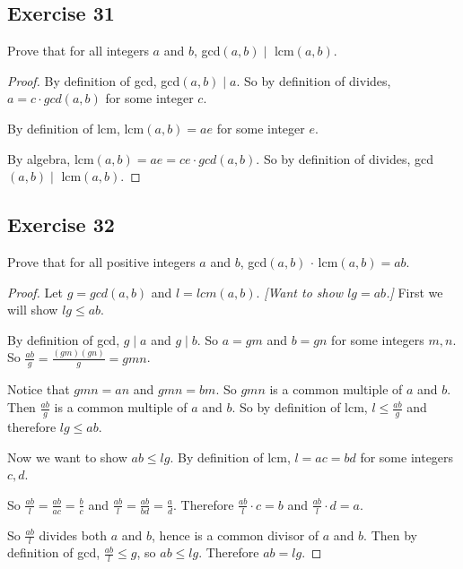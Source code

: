 \documentclass[14pt]{extarticle}
\newcommand{\dps}{\displaystyle}
\begin{document}
\subsection{Exercise 31}
Prove that for all integers $a$ and $b$, gcd$(a, b) \mid$ lcm$(a, b).$

\begin{proof}
By definition of gcd, gcd$(a, b) \mid a$. So by definition of divides, $a = c \cdot gcd(a, b)$ for some integer $c$.

By definition of lcm, lcm$(a, b) = ae$ for some integer $e$.

By algebra, lcm$(a, b) = ae = ce \cdot gcd(a,b)$. So by definition of divides, gcd$(a, b) \mid$ lcm$(a, b).$
\end{proof}

\subsection{Exercise 32}
Prove that for all positive integers $a$ and $b$, gcd$(a, b)$ $\cdot$ lcm$(a, b) = ab$.

\begin{proof}
Let $g = gcd(a,b)$ and $l = lcm(a,b)$. {\it [Want to show $lg = ab$.]} First we will show $lg \leq ab$.

By definition of gcd, $g \mid a$ and $g \mid b$. So $a = gm$ and $b = gn$ for some integers $m,n$. So $\dps\frac{ab}{g} = \frac{(gm)(gn)}{g} = gmn$. 

Notice that $gmn = an$ and $gmn = bm$. So $gmn$ is a common multiple of $a$ and $b$. Then $\dps\frac{ab}{g}$ is a common multiple of $a$ and $b$. So by definition of lcm, $l \leq \dps\frac{ab}{g}$ and therefore $lg \leq ab$.

Now we want to show $ab \leq lg$. By definition of lcm, $l = ac = bd$ for some integers $c,d$. 

So $\dps\frac{ab}{l} = \frac{ab}{ac} = \frac{b}{c}$ and $\dps\frac{ab}{l} = \frac{ab}{bd} = \frac{a}{d}$. Therefore $\dps\frac{ab}{l} \cdot c = b$ and $\dps\frac{ab}{l} \cdot d = a$. 

So $\dps\frac{ab}{l}$ divides both $a$ and $b$, hence is a common divisor of $a$ and $b$. Then by definition of gcd, $\dps\frac{ab}{l} \leq g$, so $ab \leq lg$. Therefore $ab = lg$.
\end{proof}
\end{document}
